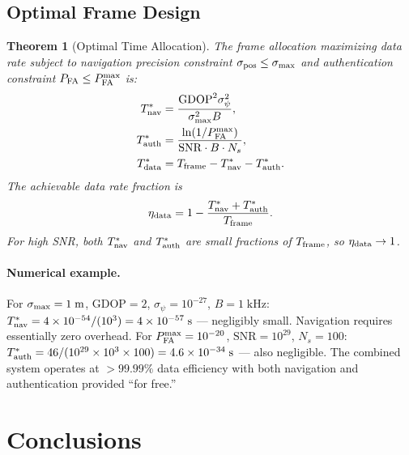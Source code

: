 \documentclass[twocolumn,superscriptaddress,prd,nofootinbib]{revtex4-2}
\newcommand{\SNR}{\mathrm{SNR}}
\newcommand{\GDOP}{\mathrm{GDOP}}
\newtheorem{theorem}{Theorem}
\begin{document}
\subsection{Optimal Frame Design}

\begin{theorem}[Optimal Time Allocation]\label{thm:time-opt}
The frame allocation maximizing data rate subject to navigation
precision constraint $\sigma_{\rm pos} \leq \sigma_{\rm max}$ and
authentication constraint $P_{\rm FA} \leq P_{\rm FA}^{\rm max}$ is:
\begin{align}
T_{\rm nav}^* &= \frac{\GDOP^2\sigma_\psi^2}{\sigma_{\rm max}^2 B}, \label{eq:Tnav-opt}\\
T_{\rm auth}^* &= \frac{\ln(1/P_{\rm FA}^{\rm max})}{\SNR\cdot B\cdot N_s}, \label{eq:Tauth-opt}\\
T_{\rm data}^* &= T_{\rm frame} - T_{\rm nav}^* - T_{\rm auth}^*. \label{eq:Tdata-opt}
\end{align}
The achievable data rate fraction is
\begin{equation}
\eta_{\rm data} = 1 - \frac{T_{\rm nav}^* + T_{\rm auth}^*}{T_{\rm frame}}.
\end{equation}
For high SNR, both $T_{\rm nav}^*$ and $T_{\rm auth}^*$ are small
fractions of $T_{\rm frame}$, so $\eta_{\rm data} \to 1$.
\end{theorem}

\paragraph{Numerical example.}
For $\sigma_{\rm max} = 1\;\text{m}$,
$\GDOP = 2$, $\sigma_\psi = 10^{-27}$, $B = 1\;\text{kHz}$:
$T_{\rm nav}^* = 4\times 10^{-54}/(10^3) = 4\times 10^{-57}\;\text{s}$
--- negligibly small. Navigation requires essentially zero overhead.
For $P_{\rm FA}^{\rm max} = 10^{-20}$, $\SNR = 10^{29}$, $N_s = 100$:
$T_{\rm auth}^* = 46/(10^{29}\times 10^3\times 100) = 4.6\times 10^{-34}\;\text{s}$
--- also negligible. The combined system operates at $>99.99\%$ data
efficiency with both navigation and authentication provided ``for free.''

\section{Conclusions}\label{sec:conclusions}
\end{document}
